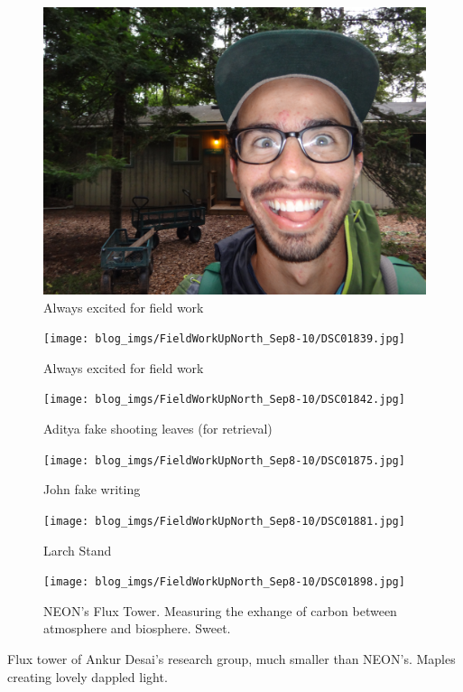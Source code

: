\documentclass{article}
\begin{document}
\begin{figure}[htbp]
\centering
\includegraphics[width=.9\linewidth]{blog_imgs/FieldWorkUpNorth_Sep8-10/DSC01835.jpg}
\caption{Always excited for field work}
\end{figure}

\begin{figure}[htbp]
\centering
\texttt{[image: blog\_imgs/FieldWorkUpNorth\_Sep8-10/DSC01839.jpg]}
\caption{Always excited for field work}
\end{figure}


\begin{figure}[htbp]
\centering
\texttt{[image: blog\_imgs/FieldWorkUpNorth\_Sep8-10/DSC01842.jpg]}
\caption{Aditya fake shooting leaves (for retrieval)}
\end{figure}

\begin{figure}[htbp]
\centering
\texttt{[image: blog\_imgs/FieldWorkUpNorth\_Sep8-10/DSC01875.jpg]}
\caption{John fake writing}
\end{figure}

\begin{figure}[htbp]
\centering
\texttt{[image: blog\_imgs/FieldWorkUpNorth\_Sep8-10/DSC01881.jpg]}
\caption{Larch Stand}
\end{figure}

\begin{figure}[htbp]
\centering
\texttt{[image: blog\_imgs/FieldWorkUpNorth\_Sep8-10/DSC01898.jpg]}
\caption{NEON's Flux Tower.  Measuring the exhange of carbon between atmosphere and biosphere.  Sweet.}
\end{figure}

\begin{video}
\end{video}
Flux tower of Ankur Desai's research group, much smaller than NEON's.  Maples creating lovely dappled light.
\end{document}
